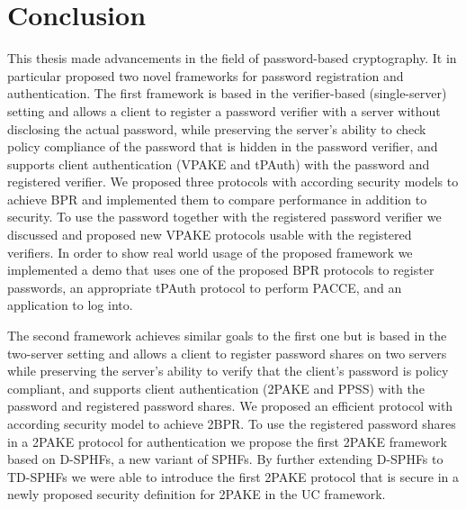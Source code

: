 \chapter{Conclusion} \label{ch:conclusion}

This thesis made advancements in the field of password-based cryptography.
It in particular proposed two novel frameworks for password registration and authentication.
The first framework is based in the verifier-based (single-server) setting and allows a client to register a password verifier with a server without disclosing the actual password, while preserving the server's ability to check policy compliance of the password that is hidden in the password verifier, and supports client authentication (\ac{VPAKE} and \ac{tPAuth}) with the password and registered verifier.
We proposed three protocols with according security models to achieve \acl{BPR} and implemented them to compare performance in addition to security.
To use the password together with the registered password verifier we discussed and proposed new \ac{VPAKE} protocols usable with the registered verifiers.
In order to show real world usage of the proposed framework we implemented a demo that uses one of the proposed \ac{BPR} protocols to register passwords, an appropriate \ac{tPAuth} protocol to perform \acl{PACCE}, and an application to log into.

The second framework achieves similar goals to the first one but is based in the two-server setting and allows a client to register password shares on two servers while preserving the server's ability to verify that the client's password is policy compliant, and supports client authentication (\ac{2PAKE} and \ac{PPSS}) with the password and registered password shares.
We proposed an efficient protocol with according security model to achieve \acl{2BPR}.
To use the registered password shares in a \ac{2PAKE} protocol for authentication we propose the first \ac{2PAKE} framework based on \aclp{D-SPHF}, a new variant of \acp{SPHF}.
By further extending \acp{D-SPHF} to \acp{TD-SPHF} we were able to introduce the first \ac{2PAKE} protocol that is secure in a newly proposed security definition for \ac{2PAKE} in the \ac{UC} framework.
